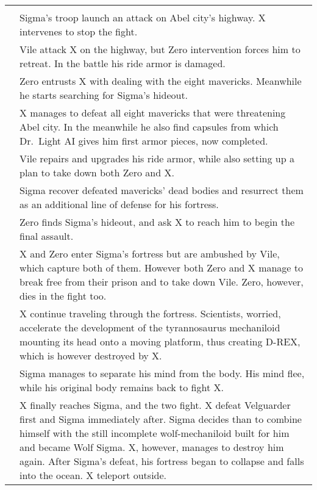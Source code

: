 \begin{tabularx}{\linewidth}{l X}
	\midrule
	\rowcolor{Aquamarine}
	\multicolumn{2}{c}{\textbf{Mega Man X}}\\
	\addlinespace[1.5ex]
	\tabdot& Sigma's troop launch an attack on Abel city's highway. X intervenes to stop the fight.\\
	\tabline& Vile attack X on the highway, but Zero intervention forces him to retreat. In the battle his ride armor is damaged.\\
	\tabdot& Zero entrusts X with dealing with the eight mavericks. Meanwhile he starts searching for Sigma's hideout.\\
	\tabdot& X manages to defeat all eight mavericks that were threatening Abel city. In the meanwhile he also find capsules from which Dr.~Light AI gives him first armor pieces, now completed.\\
	\tabdot& Vile repairs and upgrades his ride armor, while also setting up a plan to take down both Zero and X.\\
	\tabline& Sigma recover defeated mavericks' dead bodies and resurrect them as an additional line of defense for his fortress.\\
	\tabdot& Zero finds Sigma's hideout, and ask X to reach him to begin the final assault.\\
	\tabdot& X and Zero enter Sigma's fortress but are ambushed by Vile, which capture both of them. However both Zero and X manage to break free from their prison and to take down Vile. Zero, however, dies in the fight too.\\
	\tabdot& X continue traveling through the fortress. Scientists, worried, accelerate the development of the tyrannosaurus mechaniloid mounting its head onto a moving platform, thus creating D-REX, which is however destroyed by X.\\
	\tabdot& Sigma manages to separate his mind from the body. His mind flee, while his original body remains back to fight X.\\
	\tabdot& X finally reaches Sigma, and the two fight. X defeat Velguarder first and Sigma immediately after. Sigma decides than to combine himself with the still incomplete wolf-mechaniloid built for him and became Wolf Sigma. X, however, manages to destroy him again. After Sigma's defeat, his fortress began to collapse and falls into the ocean. X teleport outside.\\
 	\midrule
\end{tabularx}